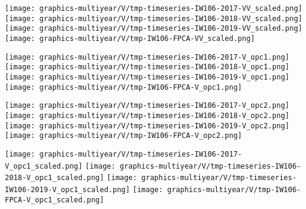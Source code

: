 
\begin{center}
\begin{minipage}{7.0in}
\texttt{[image: graphics-multiyear/V/tmp-timeseries-IW106-2017-VV\_scaled.png]}
\quad\quad
\texttt{[image: graphics-multiyear/V/tmp-timeseries-IW106-2018-VV\_scaled.png]}
\vskip 1.0cm
\texttt{[image: graphics-multiyear/V/tmp-timeseries-IW106-2019-VV\_scaled.png]}
\quad
\texttt{[image: graphics-multiyear/V/tmp-IW106-FPCA-VV\_scaled.png]}
\end{minipage}
\end{center}


\begin{center}
\begin{minipage}{7.0in}
\texttt{[image: graphics-multiyear/V/tmp-timeseries-IW106-2017-V\_opc1.png]}
\quad\quad
\texttt{[image: graphics-multiyear/V/tmp-timeseries-IW106-2018-V\_opc1.png]}
\vskip 1.0cm
\texttt{[image: graphics-multiyear/V/tmp-timeseries-IW106-2019-V\_opc1.png]}
\quad
\texttt{[image: graphics-multiyear/V/tmp-IW106-FPCA-V\_opc1.png]}
\end{minipage}
\end{center}


\begin{center}
\begin{minipage}{7.0in}
\texttt{[image: graphics-multiyear/V/tmp-timeseries-IW106-2017-V\_opc2.png]}
\quad\quad
\texttt{[image: graphics-multiyear/V/tmp-timeseries-IW106-2018-V\_opc2.png]}
\vskip 1.0cm
\texttt{[image: graphics-multiyear/V/tmp-timeseries-IW106-2019-V\_opc2.png]}
\quad
\texttt{[image: graphics-multiyear/V/tmp-IW106-FPCA-V\_opc2.png]}
\end{minipage}
\end{center}


\begin{center}
\begin{minipage}{7.0in}
\texttt{[image: graphics-multiyear/V/tmp-timeseries-IW106-2017-V\_opc1\_scaled.png]}
\quad\quad
\texttt{[image: graphics-multiyear/V/tmp-timeseries-IW106-2018-V\_opc1\_scaled.png]}
\vskip 1.0cm
\texttt{[image: graphics-multiyear/V/tmp-timeseries-IW106-2019-V\_opc1\_scaled.png]}
\quad
\texttt{[image: graphics-multiyear/V/tmp-IW106-FPCA-V\_opc1\_scaled.png]}
\end{minipage}
\end{center}

